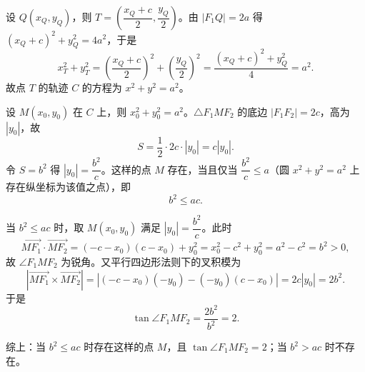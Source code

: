 \begin{answer}
设 $Q(x_Q, y_Q)$，则 $T = \left(\dfrac{x_Q + c}{2}, \dfrac{y_Q}{2}\right)$。由 $|F_1Q| = 2a$ 得 $(x_Q + c)^2 + y_Q^2 = 4a^2$，于是
\nopagebreak[4]
\[
x_T^2 + y_T^2 = \left(\frac{x_Q+c}{2}\right)^2 + \left(\frac{y_Q}{2}\right)^2 = \frac{(x_Q+c)^2 + y_Q^2}{4} = a^2.
\]
故点 $T$ 的轨迹 $C$ 的方程为 $x^2 + y^2 = a^2$。


设 $M(x_0, y_0)$ 在 $C$ 上，则 $x_0^2 + y_0^2 = a^2$。$\triangle F_1MF_2$ 的底边 $|F_1F_2| = 2c$，高为 $|y_0|$，故
\nopagebreak[4]
\[
S = \frac{1}{2}\cdot 2c \cdot |y_0| = c|y_0|.
\]
令 $S = b^2$ 得 $|y_0| = \dfrac{b^2}{c}$。这样的点 $M$ 存在，当且仅当 $\dfrac{b^2}{c} \leqslant a$（圆 $x^2+y^2=a^2$ 上存在纵坐标为该值之点），即
\nopagebreak[4]
\[
b^2 \leqslant ac.
\]

当 $b^2 \leqslant ac$ 时，取 $M(x_0, y_0)$ 满足 $|y_0| = \dfrac{b^2}{c}$。此时
\nopagebreak[4]
\[
\overrightarrow{MF_1} \cdot \overrightarrow{MF_2} = (-c-x_0)(c-x_0) + y_0^2 = x_0^2 - c^2 + y_0^2 = a^2 - c^2 = b^2 > 0,
\]
故 $\angle F_1MF_2$ 为锐角。又平行四边形法则下的叉积模为
\nopagebreak[4]
\[
\left|\overrightarrow{MF_1} \times \overrightarrow{MF_2}\right| = \left|(-c-x_0)(-y_0) - (-y_0)(c-x_0)\right| = 2c|y_0| = 2b^2.
\]
于是
\nopagebreak[4]
\[
\tan\angle F_1MF_2 = \frac{2b^2}{b^2} = 2.
\]

综上：当 $b^2 \leqslant ac$ 时存在这样的点 $M$，且 $\tan\angle F_1MF_2 = 2$；当 $b^2 > ac$ 时不存在。




\end{answer}
